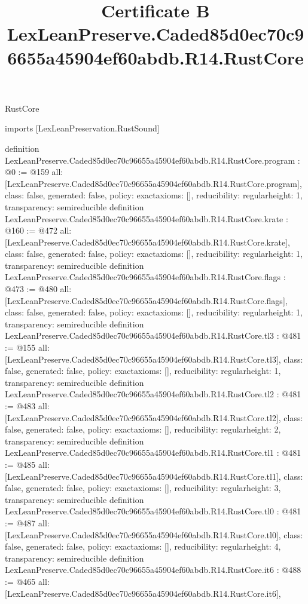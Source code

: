 \begin{lexlean}{RustCore}
\title{Certificate B LexLeanPreserve.Caded85d0ec70c96655a45904ef60abdb.R14.RustCore}
\begin{coremodule}
imports [LexLeanPreservation.RustSound]

definition LexLeanPreserve.Caded85d0ec70c96655a45904ef60abdb.R14.RustCore.program : @0 := @159 {
  all: [LexLeanPreserve.Caded85d0ec70c96655a45904ef60abdb.R14.RustCore.program],
  class: false,
  generated: false,
  policy: exact{axioms: []},
  reducibility: regular{height: 1},
  transparency: semireducible
}
definition LexLeanPreserve.Caded85d0ec70c96655a45904ef60abdb.R14.RustCore.krate : @160 := @472 {
  all: [LexLeanPreserve.Caded85d0ec70c96655a45904ef60abdb.R14.RustCore.krate],
  class: false,
  generated: false,
  policy: exact{axioms: []},
  reducibility: regular{height: 1},
  transparency: semireducible
}
definition LexLeanPreserve.Caded85d0ec70c96655a45904ef60abdb.R14.RustCore.flags : @473 := @480 {
  all: [LexLeanPreserve.Caded85d0ec70c96655a45904ef60abdb.R14.RustCore.flags],
  class: false,
  generated: false,
  policy: exact{axioms: []},
  reducibility: regular{height: 1},
  transparency: semireducible
}
definition LexLeanPreserve.Caded85d0ec70c96655a45904ef60abdb.R14.RustCore.tl3 : @481 := @155 {
  all: [LexLeanPreserve.Caded85d0ec70c96655a45904ef60abdb.R14.RustCore.tl3],
  class: false,
  generated: false,
  policy: exact{axioms: []},
  reducibility: regular{height: 1},
  transparency: semireducible
}
definition LexLeanPreserve.Caded85d0ec70c96655a45904ef60abdb.R14.RustCore.tl2 : @481 := @483 {
  all: [LexLeanPreserve.Caded85d0ec70c96655a45904ef60abdb.R14.RustCore.tl2],
  class: false,
  generated: false,
  policy: exact{axioms: []},
  reducibility: regular{height: 2},
  transparency: semireducible
}
definition LexLeanPreserve.Caded85d0ec70c96655a45904ef60abdb.R14.RustCore.tl1 : @481 := @485 {
  all: [LexLeanPreserve.Caded85d0ec70c96655a45904ef60abdb.R14.RustCore.tl1],
  class: false,
  generated: false,
  policy: exact{axioms: []},
  reducibility: regular{height: 3},
  transparency: semireducible
}
definition LexLeanPreserve.Caded85d0ec70c96655a45904ef60abdb.R14.RustCore.tl0 : @481 := @487 {
  all: [LexLeanPreserve.Caded85d0ec70c96655a45904ef60abdb.R14.RustCore.tl0],
  class: false,
  generated: false,
  policy: exact{axioms: []},
  reducibility: regular{height: 4},
  transparency: semireducible
}
definition LexLeanPreserve.Caded85d0ec70c96655a45904ef60abdb.R14.RustCore.it6 : @488 := @465 {
  all: [LexLeanPreserve.Caded85d0ec70c96655a45904ef60abdb.R14.RustCore.it6],
}
\end{coremodule}
\end{lexlean}

